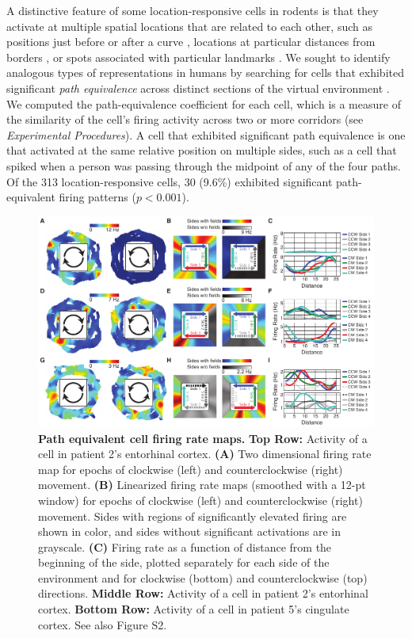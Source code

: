 A distinctive feature of some location-responsive cells in rodents is that they activate at multiple  spatial locations that are related to each other, such as positions just before or after a curve \cite{FranEtal00}, locations at particular distances from borders \cite{SolsEtal08,DerdEtal09,BjerEtal14}, or spots associated with particular landmarks \cite{HargEtal05,TsaoEtal13}.  We sought to identify analogous  types of representations in humans by searching for cells that exhibited significant \emph{path equivalence} across distinct sections of the virtual environment \cite{FranEtal00}.  We computed the path-equivalence coefficient for each cell, which is a measure of the similarity of the cell's firing activity across two or more corridors (see \emph{Experimental Procedures}).  A cell that exhibited significant path equivalence is one that activated at the same relative position on multiple sides, such as a cell that spiked when a person was passing through the midpoint of any of the four paths.  Of the 313 location-responsive cells, 30 (9.6\%) exhibited significant path-equivalent firing patterns ($p<0.001$).


\begin{figure}
\centering
\includegraphics[width=.99\textwidth]{./tex/linearGrids/figs/Figure2}
\caption[Path equivalent cell firing rate maps]{\textbf{Path equivalent cell firing rate maps.} \textbf{Top Row:} Activity of a cell in patient 2's entorhinal cortex. \textbf{(A)} Two dimensional firing rate map for epochs of clockwise (left) and counterclockwise (right) movement. \textbf{(B)} Linearized firing rate maps (smoothed with a 12-pt window) for epochs of clockwise (left) and counterclockwise (right) movement. Sides with regions of significantly elevated firing are shown in color, and sides without significant activations are in grayscale. \textbf{(C)} Firing rate as a function of distance from the beginning of the side, plotted separately for each side of the environment and for clockwise (bottom) and counterclockwise (top) directions. \textbf{Middle Row:} Activity of a cell in patient 2's  entorhinal cortex. \textbf{Bottom Row:} Activity of a cell in patient 5's cingulate cortex. See also Figure S2.}
\label{fig:firingExamples}
\end{figure}

